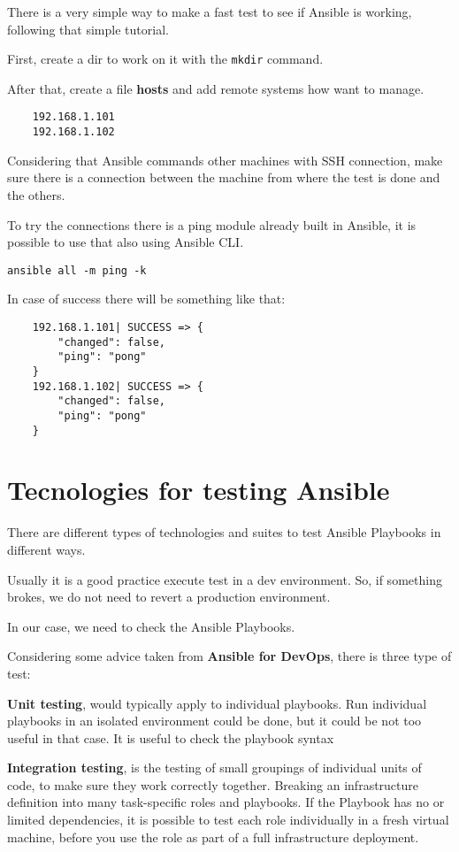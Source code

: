 \documentclass[12pt,a4paper,openright,twoside]{book}
\begin{document}
There is a very simple way to make a fast test to see if Ansible is working, following that simple tutorial\cite{ansibleRIP}.


First, create a dir to work on it with the \texttt{mkdir} command.


After that, create a file \textbf{hosts} and add remote systems how want to manage.
\begin{lstlisting}
    192.168.1.101
    192.168.1.102
\end{lstlisting}

Considering that Ansible commands other machines with SSH connection, make sure there is a connection between the machine from where the test is done and the others.

To try the connections there is a ping module already built in Ansible, it is possible to use that also using Ansible CLI.
\begin{lstlisting}
ansible all -m ping -k
\end{lstlisting}

In case of success there will be something like that:
\begin{lstlisting}
    192.168.1.101| SUCCESS => {
        "changed": false, 
        "ping": "pong"
    }
    192.168.1.102| SUCCESS => {
        "changed": false, 
        "ping": "pong"
    }
\end{lstlisting}

\section{Tecnologies for testing Ansible}
There are different types of technologies and suites to test Ansible Playbooks in different ways.


Usually it is a good practice execute test in a dev environment. So, if something brokes, we do not need to revert  a production environment.


In our case, we need to check the Ansible Playbooks.

Considering some advice taken from \textbf{Ansible for DevOps}\cite{ansibleForDevOps}, there is three type of test:


\textbf{Unit testing}, would typically apply to individual playbooks.
Run individual playbooks in an isolated environment could be done, but it could be not too useful in that case. It is useful to check the playbook syntax

\textbf{Integration testing}, is the testing of small groupings of individual units of code, to make sure they work correctly together.
Breaking an infrastructure definition into many task-specific roles and playbooks. If the Playbook has no or limited dependencies, it is possible to test each role individually in a fresh virtual machine, before you use the role as part of a full infrastructure deployment.
\end{document}
